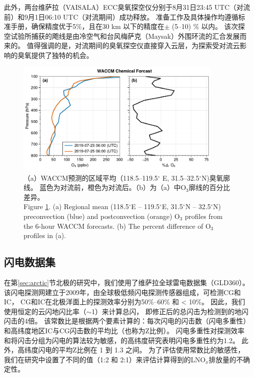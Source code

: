 此外，两台维萨拉（VAISALA）ECC臭氧探空仪分别于8月31日23:45 UTC（对流前）和9月1日06:10 UTC（对流期间）成功释放。
准备工作及具体操作均遵循标准手册，确保精度优于5\%，且在30 km 以下的精度在$\pm$ (5--10) \% 以内\citep{Smit.2007}。
该次探空试验所捕获的飑线是由冷空气和台风梅萨克（Maysak）外围环流的汇合发展而来的。
值得强调的是，对流期间的臭氧探空仪直接穿入云层，为探索受对流云影响的臭氧提供了独特的机会。



\begin{figure}[!htbp]
\centering
\includegraphics[width=0.9\textwidth]{./figures/waccm_forcast_o3.pdf}
\caption{（a）WACCM预测的区域平均（118.5--119.5$^{\circ}$ E, 31.5--32.5$^{\circ}$N)臭氧廓线。
蓝色为对流前，橙色为对流后。（b）为（a）中O$_3$廓线的百分比差异。\\
Figure \ref{fig:waccm_forcast_o3}. (a) Regional mean (118.5$^{\circ}$E – 119.5$^{\circ}$E, 31.5$^{\circ}$N – 32.5$^{\circ}$N)
preconvection (blue) and postconvection (orange) O$_3$ profiles from the 6-hour WACCM forecasts.
(b) The percent difference of O$_3$ profiles in (a).
}
\label{fig:waccm_forcast_o3}
\end{figure}

\subsection{闪电数据集}

在第\ref{sec:arctic}节北极的研究中，我们使用了维萨拉全球雷电数据集（GLD360）。
该闪电探测网建立于2009年，由全球极低频闪电探测传感器组成，可检测CG和IC\citep{Said.2010,Said.2013,Said.2017}，
CG和IC在北极洋面上的探测效率分别为50\%--60\% 和 < 10\%\citep{Vagasky.2022}。
因此，我们使用恒定的云闪地闪比率（$\sim$1）来计算总闪，
即修正后的总闪击为检测到的地闪闪击的4倍\citep{Mackerras.1994,Prentice.1977}。
该常数比是根据两个要素计算的：每次闪电的闪击数（闪电多重性）和高纬度地区IC与CG闪击数的平均比（也称为Z比例）。
闪电多重性对探测效率和将闪击分组为闪电的算法较为敏感\citep{Schulz.2005,Yair.2014,Burgesser.2017,Kolmasova.2022}，\citet{Yusop.2019}的高纬度研究表明闪电多重性约为1.2。
此外，高纬度闪电的平均Z比例在 1 到 1.3 之间\citep{Mackerras.1994,Prentice.1977,Bandholnopparat.2020}。
为了评估使用常数比的敏感性，我们在研究中设置了不同的值（1:2 和 2:1）来评估计算得到的LNO$_x$排放量的不确定性。


